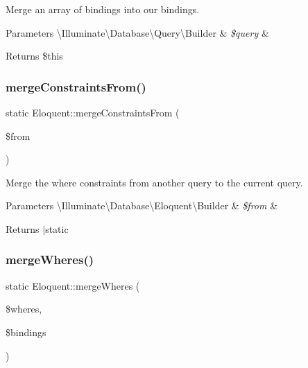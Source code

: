 Merge an array of bindings into our bindings.


\begin{DoxyParams}[1]{Parameters}
\textbackslash{}\+Illuminate\textbackslash{}\+Database\textbackslash{}\+Query\textbackslash{}\+Builder & {\em \$query} & \\
\hline
\end{DoxyParams}
\begin{DoxyReturn}{Returns}
\$this 
\end{DoxyReturn}
\mbox{\label{class_eloquent_a543e7d748eb32bb2b2b526c1519fe3ff}} 
\subsubsection{\texorpdfstring{merge\+Constraints\+From()}{mergeConstraintsFrom()}}
{\footnotesize\ttfamily static Eloquent\+::merge\+Constraints\+From (\begin{DoxyParamCaption}\item[{}]{\$from }\end{DoxyParamCaption})\hspace{0.3cm}{\ttfamily [static]}}

Merge the where constraints from another query to the current query.


\begin{DoxyParams}[1]{Parameters}
\textbackslash{}\+Illuminate\textbackslash{}\+Database\textbackslash{}\+Eloquent\textbackslash{}\+Builder & {\em \$from} & \\
\hline
\end{DoxyParams}
\begin{DoxyReturn}{Returns}
$\vert$static 
\end{DoxyReturn}
\mbox{\label{class_eloquent_ad8f6918463427fbcea1a870ec8ffd883}} 
\subsubsection{\texorpdfstring{merge\+Wheres()}{mergeWheres()}}
{\footnotesize\ttfamily static Eloquent\+::merge\+Wheres (\begin{DoxyParamCaption}\item[{}]{\$wheres,  }\item[{}]{\$bindings }\end{DoxyParamCaption})\hspace{0.3cm}{\ttfamily [static]}}

